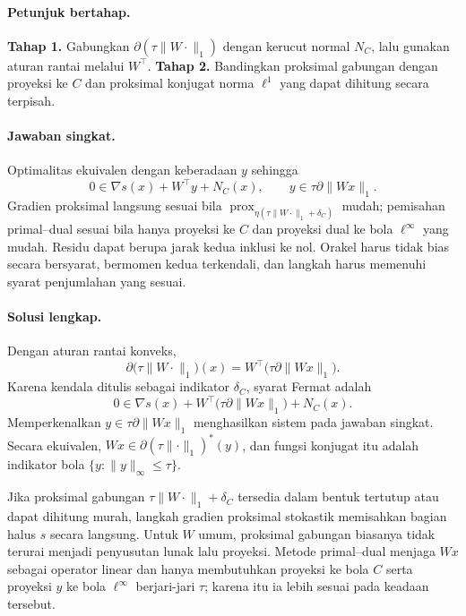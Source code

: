 \paragraph{Petunjuk bertahap.}
\label{orig03:final:hint:0008}
\textbf{Tahap 1.} Gabungkan $\partial(\tau\lVert W\cdot\rVert_1)$ dengan
kerucut normal $N_C$, lalu gunakan aturan rantai melalui $W^\top$.
\textbf{Tahap 2.} Bandingkan proksimal gabungan dengan proyeksi ke $C$ dan
proksimal konjugat norma $\ell^1$ yang dapat dihitung secara terpisah.

\paragraph{Jawaban singkat.}
\label{orig03:final:answer:0008}
Optimalitas ekuivalen dengan keberadaan $y$ sehingga
\[
 0\in\nabla s(x)+W^\top y+N_C(x),
 \qquad y\in\tau\partial\lVert Wx\rVert_1.
\]
Gradien proksimal langsung sesuai bila
$\operatorname{prox}_{\eta(\tau\lVert W\cdot\rVert_1+\delta_C)}$ mudah;
pemisahan primal--dual sesuai bila hanya proyeksi ke $C$ dan proyeksi dual ke
bola $\ell^\infty$ yang mudah. Residu dapat berupa jarak kedua inklusi ke nol.
Orakel harus tidak bias secara bersyarat, bermomen kedua terkendali, dan
langkah harus memenuhi syarat penjumlahan yang sesuai.

\paragraph{Solusi lengkap.}
\label{orig03:final:solution:0008}
Dengan aturan rantai konveks,
\[
 \partial\bigl(\tau\lVert W\cdot\rVert_1\bigr)(x)
 =W^\top\bigl(\tau\partial\lVert Wx\rVert_1\bigr).
\]
Karena kendala ditulis sebagai indikator $\delta_C$, syarat Fermat adalah
\[
 0\in\nabla s(x)+W^\top
       \bigl(\tau\partial\lVert Wx\rVert_1\bigr)+N_C(x).
\]
Memperkenalkan $y\in\tau\partial\lVert Wx\rVert_1$ menghasilkan sistem pada
jawaban singkat. Secara ekuivalen,
$Wx\in\partial(\tau\lVert\cdot\rVert_1)^*(y)$, dan fungsi konjugat itu adalah
indikator bola $\{y:\lVert y\rVert_\infty\le\tau\}$.

Jika proksimal gabungan
$\tau\lVert W\cdot\rVert_1+\delta_C$ tersedia dalam bentuk tertutup atau dapat
dihitung murah, langkah gradien proksimal stokastik memisahkan bagian halus
$s$ secara langsung. Untuk $W$ umum, proksimal gabungan biasanya tidak
terurai menjadi penyusutan lunak lalu proyeksi. Metode primal--dual menjaga
$Wx$ sebagai operator linear dan hanya membutuhkan proyeksi ke bola $C$ serta
proyeksi $y$ ke bola $\ell^\infty$ berjari-jari $\tau$; karena itu ia lebih
sesuai pada keadaan tersebut.

